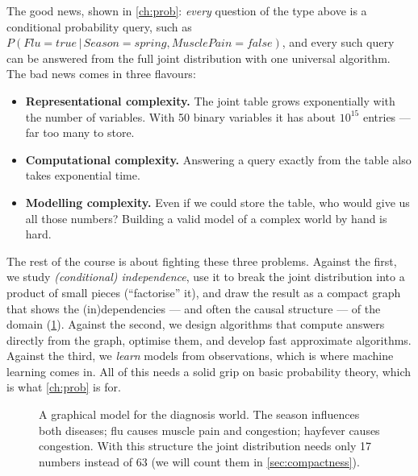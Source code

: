 \documentclass[11pt, oneside]{book}
\newcommand{\Prob}{\mathbb{P}}           %
\newcommand{\given}{\,\vert\,}           %
\newcommand{\vn}[1]{\mathit{#1}}         %
\begin{document}
The good news, shown in \cref{ch:prob}: \emph{every} question of the type above
is a conditional probability query, such as
$P(\vn{Flu} = \vn{true} \given \vn{Season} = \vn{spring}, \vn{MusclePain} = \vn{false})$,
and every such query can be answered from the full joint distribution with one
universal algorithm. The bad news comes in three flavours:

\begin{itemize}
  \item \textbf{Representational complexity.} The joint table grows
    exponentially with the number of variables. With 50 binary variables it
    has about $10^{15}$ entries --- far too many to store.
  \item \textbf{Computational complexity.} Answering a query exactly from the
    table also takes exponential time.
  \item \textbf{Modelling complexity.} Even if we could store the table, who
    would give us all those numbers? Building a valid model of a complex world
    by hand is hard.
\end{itemize}

The rest of the course is about fighting these three problems. Against the
first, we study \emph{(conditional) independence}, use it to break the joint
distribution into a product of small pieces (``factorise'' it), and draw the
result as a compact graph that shows the (in)dependencies --- and often the
causal structure --- of the domain (\cref{fig:diagnosis-net}). Against the
second, we design algorithms that compute answers directly from the graph,
optimise them, and develop fast approximate algorithms. Against the third, we
\emph{learn} models from observations, which is where machine learning comes
in. All of this needs a solid grip on basic probability theory, which is what
\cref{ch:prob} is for.

\begin{figure}[htbp]
\centering
{}
\caption{A graphical model for the diagnosis world. The season influences both
diseases; flu causes muscle pain and congestion; hayfever causes congestion.
With this structure the joint distribution needs only 17 numbers instead of 63
(we will count them in \cref{sec:compactness}).}
\label{fig:diagnosis-net}
\end{figure}
\end{document}
